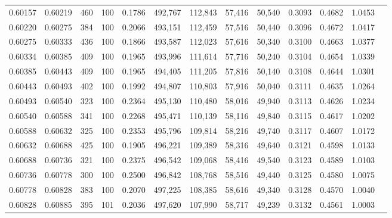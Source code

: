 \begin{tabular}{rrrrrrrrrrrrr}
0.60157 & 0.60219 &   460 & 100 &                                     0.1786 & 492,767 & 112,843 &  57,416 &  50,540 & 0.3093 & 0.4682 & 1.0453 \\
0.60220 & 0.60275 &   384 & 100 &                                     0.2066 & 493,151 & 112,459 &  57,516 &  50,440 & 0.3096 & 0.4672 & 1.0417 \\
0.60275 & 0.60333 &   436 & 100 &                                     0.1866 & 493,587 & 112,023 &  57,616 &  50,340 & 0.3100 & 0.4663 & 1.0377 \\
0.60334 & 0.60385 &   409 & 100 &                                     0.1965 & 493,996 & 111,614 &  57,716 &  50,240 & 0.3104 & 0.4654 & 1.0339 \\
0.60385 & 0.60443 &   409 & 100 &                                     0.1965 & 494,405 & 111,205 &  57,816 &  50,140 & 0.3108 & 0.4644 & 1.0301 \\
0.60443 & 0.60493 &   402 & 100 &                                     0.1992 & 494,807 & 110,803 &  57,916 &  50,040 & 0.3111 & 0.4635 & 1.0264 \\
0.60493 & 0.60540 &   323 & 100 &                                     0.2364 & 495,130 & 110,480 &  58,016 &  49,940 & 0.3113 & 0.4626 & 1.0234 \\
0.60540 & 0.60588 &   341 & 100 &                                     0.2268 & 495,471 & 110,139 &  58,116 &  49,840 & 0.3115 & 0.4617 & 1.0202 \\
0.60588 & 0.60632 &   325 & 100 &                                     0.2353 & 495,796 & 109,814 &  58,216 &  49,740 & 0.3117 & 0.4607 & 1.0172 \\
0.60632 & 0.60688 &   425 & 100 &                                     0.1905 & 496,221 & 109,389 &  58,316 &  49,640 & 0.3121 & 0.4598 & 1.0133 \\
0.60688 & 0.60736 &   321 & 100 &                                     0.2375 & 496,542 & 109,068 &  58,416 &  49,540 & 0.3123 & 0.4589 & 1.0103 \\
0.60736 & 0.60778 &   300 & 100 &                                     0.2500 & 496,842 & 108,768 &  58,516 &  49,440 & 0.3125 & 0.4580 & 1.0075 \\
0.60778 & 0.60828 &   383 & 100 &                                     0.2070 & 497,225 & 108,385 &  58,616 &  49,340 & 0.3128 & 0.4570 & 1.0040 \\
0.60828 & 0.60885 &   395 & 101 &                                     0.2036 & 497,620 & 107,990 &  58,717 &  49,239 & 0.3132 & 0.4561 & 1.0003 \\

\end{tabular}
